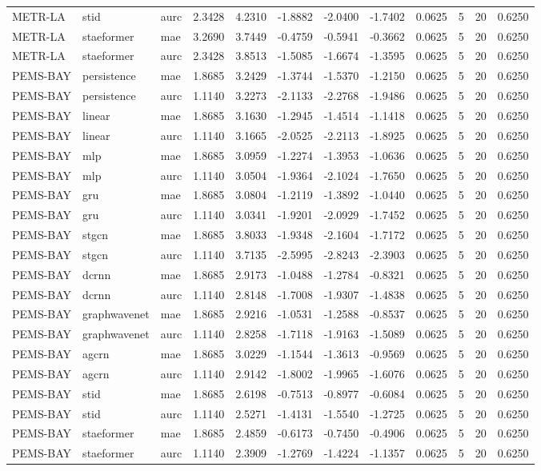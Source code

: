 \begin{tabular}{lllrrrrrrrrr}
METR-LA & stid & aurc & 2.3428 & 4.2310 & -1.8882 & -2.0400 & -1.7402 & 0.0625 & 5 & 20 & 0.6250 \\
METR-LA & staeformer & mae & 3.2690 & 3.7449 & -0.4759 & -0.5941 & -0.3662 & 0.0625 & 5 & 20 & 0.6250 \\
METR-LA & staeformer & aurc & 2.3428 & 3.8513 & -1.5085 & -1.6674 & -1.3595 & 0.0625 & 5 & 20 & 0.6250 \\
PEMS-BAY & persistence & mae & 1.8685 & 3.2429 & -1.3744 & -1.5370 & -1.2150 & 0.0625 & 5 & 20 & 0.6250 \\
PEMS-BAY & persistence & aurc & 1.1140 & 3.2273 & -2.1133 & -2.2768 & -1.9486 & 0.0625 & 5 & 20 & 0.6250 \\
PEMS-BAY & linear & mae & 1.8685 & 3.1630 & -1.2945 & -1.4514 & -1.1418 & 0.0625 & 5 & 20 & 0.6250 \\
PEMS-BAY & linear & aurc & 1.1140 & 3.1665 & -2.0525 & -2.2113 & -1.8925 & 0.0625 & 5 & 20 & 0.6250 \\
PEMS-BAY & mlp & mae & 1.8685 & 3.0959 & -1.2274 & -1.3953 & -1.0636 & 0.0625 & 5 & 20 & 0.6250 \\
PEMS-BAY & mlp & aurc & 1.1140 & 3.0504 & -1.9364 & -2.1024 & -1.7650 & 0.0625 & 5 & 20 & 0.6250 \\
PEMS-BAY & gru & mae & 1.8685 & 3.0804 & -1.2119 & -1.3892 & -1.0440 & 0.0625 & 5 & 20 & 0.6250 \\
PEMS-BAY & gru & aurc & 1.1140 & 3.0341 & -1.9201 & -2.0929 & -1.7452 & 0.0625 & 5 & 20 & 0.6250 \\
PEMS-BAY & stgcn & mae & 1.8685 & 3.8033 & -1.9348 & -2.1604 & -1.7172 & 0.0625 & 5 & 20 & 0.6250 \\
PEMS-BAY & stgcn & aurc & 1.1140 & 3.7135 & -2.5995 & -2.8243 & -2.3903 & 0.0625 & 5 & 20 & 0.6250 \\
PEMS-BAY & dcrnn & mae & 1.8685 & 2.9173 & -1.0488 & -1.2784 & -0.8321 & 0.0625 & 5 & 20 & 0.6250 \\
PEMS-BAY & dcrnn & aurc & 1.1140 & 2.8148 & -1.7008 & -1.9307 & -1.4838 & 0.0625 & 5 & 20 & 0.6250 \\
PEMS-BAY & graphwavenet & mae & 1.8685 & 2.9216 & -1.0531 & -1.2588 & -0.8537 & 0.0625 & 5 & 20 & 0.6250 \\
PEMS-BAY & graphwavenet & aurc & 1.1140 & 2.8258 & -1.7118 & -1.9163 & -1.5089 & 0.0625 & 5 & 20 & 0.6250 \\
PEMS-BAY & agcrn & mae & 1.8685 & 3.0229 & -1.1544 & -1.3613 & -0.9569 & 0.0625 & 5 & 20 & 0.6250 \\
PEMS-BAY & agcrn & aurc & 1.1140 & 2.9142 & -1.8002 & -1.9965 & -1.6076 & 0.0625 & 5 & 20 & 0.6250 \\
PEMS-BAY & stid & mae & 1.8685 & 2.6198 & -0.7513 & -0.8977 & -0.6084 & 0.0625 & 5 & 20 & 0.6250 \\
PEMS-BAY & stid & aurc & 1.1140 & 2.5271 & -1.4131 & -1.5540 & -1.2725 & 0.0625 & 5 & 20 & 0.6250 \\
PEMS-BAY & staeformer & mae & 1.8685 & 2.4859 & -0.6173 & -0.7450 & -0.4906 & 0.0625 & 5 & 20 & 0.6250 \\
PEMS-BAY & staeformer & aurc & 1.1140 & 2.3909 & -1.2769 & -1.4224 & -1.1357 & 0.0625 & 5 & 20 & 0.6250 \\
\bottomrule
\end{tabular}
